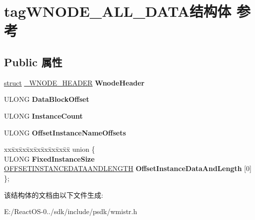 \hypertarget{structtag_w_n_o_d_e___a_l_l___d_a_t_a}{}\section{tag\+W\+N\+O\+D\+E\+\_\+\+A\+L\+L\+\_\+\+D\+A\+T\+A结构体 参考}
\label{structtag_w_n_o_d_e___a_l_l___d_a_t_a}
\subsection*{Public 属性}
\begin{DoxyCompactItemize}
\item 
\mbox{\label{structtag_w_n_o_d_e___a_l_l___d_a_t_a_a8afa8daa5524c8e93e242aa1063e7cce}} 
\hyperlink{interfacestruct}{struct} \hyperlink{struct___w_n_o_d_e___h_e_a_d_e_r}{\+\_\+\+W\+N\+O\+D\+E\+\_\+\+H\+E\+A\+D\+ER} {\bfseries Wnode\+Header}
\item 
\mbox{\label{structtag_w_n_o_d_e___a_l_l___d_a_t_a_ab11352d32e8439668e0a7fc899828a38}} 
U\+L\+O\+NG {\bfseries Data\+Block\+Offset}
\item 
\mbox{\label{structtag_w_n_o_d_e___a_l_l___d_a_t_a_a51cca5dfbc19d75c481ab27d35f59653}} 
U\+L\+O\+NG {\bfseries Instance\+Count}
\item 
\mbox{\label{structtag_w_n_o_d_e___a_l_l___d_a_t_a_a1849ab165209ae77ee38c4c723752f7c}} 
U\+L\+O\+NG {\bfseries Offset\+Instance\+Name\+Offsets}
\item 
\mbox{\label{structtag_w_n_o_d_e___a_l_l___d_a_t_a_a53c01e699186f170f8262983499dd72d}} 
\begin{tabbing}
xx\=xx\=xx\=xx\=xx\=xx\=xx\=xx\=xx\=\kill
union \{\\
\>ULONG {\bfseries FixedInstanceSize}\\
\>\hyperlink{struct_o_f_f_s_e_t_i_n_s_t_a_n_c_e_d_a_t_a_a_n_d_l_e_n_g_t_h}{OFFSETINSTANCEDATAANDLENGTH} {\bfseries OffsetInstanceDataAndLength} \mbox{[}0\mbox{]}\\
\}; \\

\end{tabbing}\end{DoxyCompactItemize}


该结构体的文档由以下文件生成\+:\begin{DoxyCompactItemize}
\item 
E\+:/\+React\+O\+S-\/0../sdk/include/psdk/wmistr.\+h\end{DoxyCompactItemize}
